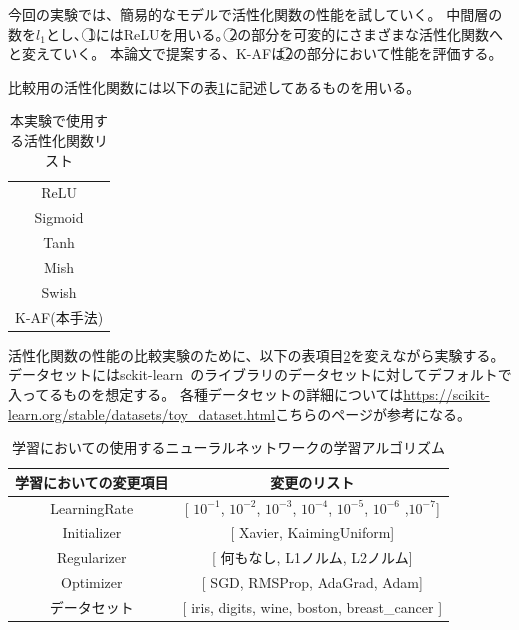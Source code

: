 今回の実験では、簡易的なモデルで活性化関数の性能を試していく。
中間層の数を$ l_1 $とし、\textcircled{\scriptsize 1}にはReLUを用いる。\textcircled{\scriptsize 2}の部分を可変的にさまざまな活性化関数へと変えていく。
本論文で提案する、K-AFは\textcircled{\scriptsize 2}の部分において性能を評価する。

比較用の活性化関数には以下の表\ref{list:af_table}に記述してあるものを用いる。


\begin{table}[htbp]
    \begin{center}
        \caption{本実験で使用する活性化関数リスト}
        \label{list:af_table}
        \vspace{2mm} 
        \begin{tabular}{ |c| }
        \hline
        ReLU \\
        Sigmoid \\
        Tanh   \\
        Mish  \\
        Swish  \\
        K-AF(本手法)   \\
        \hline
        \end{tabular}
    \end{center}
\end{table}



活性化関数の性能の比較実験のために、以下の表項目\ref{list:learning_algorithm_change}を変えながら実験する。
データセットにはsckit-learn~\cite{scikit-learn}のライブラリのデータセットに対してデフォルトで入ってるものを想定する。
各種データセットの詳細については\url{https://scikit-learn.org/stable/datasets/toy_dataset.html}こちらのページが参考になる。



\begin{table}[htbp]
    \begin{center}
        \caption{学習においての使用するニューラルネットワークの学習アルゴリズム}
        \label{list:learning_algorithm_change}
        \vspace{2mm} 
        \begin{tabular}{ |c|c| }
        \hline
        学習においての変更項目 & 変更のリスト\\
        \hline
        LearningRate           & [  $10^{-1}$,  $10^{-2}$,  $10^{-3}$,  $10^{-4}$, $10^{-5}$, $10^{-6}$ ,$10^{-7}$]    \\
        \hline
        Initializer         & [ Xavier, KaimingUniform]   \\
        \hline
        Regularizer           & [ 何もなし, L1ノルム, L2ノルム]     \\
        \hline
        Optimizer         & [ SGD, RMSProp, AdaGrad, Adam]   \\
        \hline
        データセット &  [ iris, digits, wine, boston, breast\_cancer ]    \\
        \hline
        \end{tabular}
    \end{center}
\end{table}



